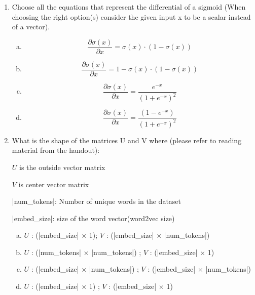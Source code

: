 \begin{enumerate}[1.]
\item {}
Choose all the equations that represent the differential of a sigmoid (When choosing the right option(s) consider the given input x to be a scalar instead of a vector).
\begin{enumerate}[(a)]
\item \begin{equation*}\frac{\partial \sigma(x)}{\partial x} = {\sigma(x) \cdot (1-\sigma(x))}\end{equation*}
\item \begin{equation*}\frac{\partial \sigma(x)}{\partial x} = 1 - {\sigma(x) \cdot (1-\sigma(x))}\end{equation*}
\item \begin{equation*}\frac{\partial \sigma(x)}{\partial x} = \frac{e^{-x}}{(1+e^{-x})^2}\end{equation*}
\item \begin{equation*}\frac{\partial \sigma(x)}{\partial x} = \frac{ (1-e^{-x})}{(1+e^{-x})^2}\end{equation*}
\end{enumerate}


\item {}
What is the shape of the matrices U and V where (please refer to reading material from the handout):

$U$ is the outside vector matrix

$V$ is center vector matrix

|num_tokens|: Number of unique words in the dataset

|embed_size|: size of the word vector(word2vec size)

\begin{enumerate}[(a)]
\item $U$ : (|embed_size| $\times$ 1); $V$ : (|embed_size| $\times$ |num_tokens|)
\item $U$ : (|num_tokens| $\times$ |num_tokens|) ; $V$ : (|embed_size| $\times$ 1)
\item $U$ : (|embed_size| $\times$ |num_tokens|) ; $V$ : (|embed_size| $\times$ |num_tokens|) 
\item $U$ : (|embed_size| $\times$ 1) ; $V$ : (|embed_size| $\times$ 1) 
\end{enumerate}


\end{enumerate}
